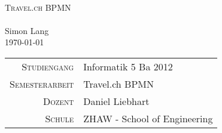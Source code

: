 




\begin{titlepage}
	\mbox{}\vspace{5\baselineskip}\\
	\rmfamily\huge
	\centering
	\textsc{Travel.ch BPMN} \\
	\mbox{}\vspace{1\baselineskip}\\
	Simon Lang\\
	\vspace{2\baselineskip}
	\rmfamily\Large
	\today\\
	\mbox{}
	
	\vfill

	\begin{center}
		\begin{tabular}[h]{ r l }
			\textsc{\small{Studiengang}} & Informatik 5 Ba 2012\\
			\textsc{\small{Semesterarbeit}} & Travel.ch BPMN\\
			\textsc{\small{Dozent}} &  Daniel Liebhart\\
			\textsc{\small{Schule}} & ZHAW - School of Engineering\\
		\end{tabular}
	\end{center}

\end{titlepage}




% 
